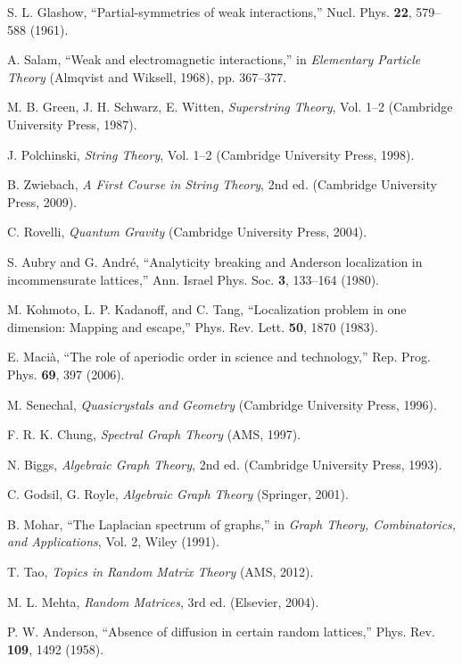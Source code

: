\documentclass[12pt,a4paper]{article}
\begin{document}
\begin{thebibliography}{99}
S. L. Glashow, ``Partial-symmetries of weak interactions,'' Nucl. Phys. \textbf{22}, 579–588 (1961).

A. Salam, ``Weak and electromagnetic interactions,'' in \emph{Elementary Particle Theory} (Almqvist and Wiksell, 1968), pp. 367–377.

M. B. Green, J. H. Schwarz, E. Witten, \emph{Superstring Theory}, Vol. 1–2 (Cambridge University Press, 1987).

J. Polchinski, \emph{String Theory}, Vol. 1–2 (Cambridge University Press, 1998).

B. Zwiebach, \emph{A First Course in String Theory}, 2nd ed. (Cambridge University Press, 2009).

C. Rovelli, \emph{Quantum Gravity} (Cambridge University Press, 2004).

S. Aubry and G. André, ``Analyticity breaking and Anderson localization in incommensurate lattices,'' Ann. Israel Phys. Soc. \textbf{3}, 133–164 (1980).

M. Kohmoto, L. P. Kadanoff, and C. Tang, ``Localization problem in one dimension: Mapping and escape,'' Phys. Rev. Lett. \textbf{50}, 1870 (1983).

E. Macià, ``The role of aperiodic order in science and technology,'' Rep. Prog. Phys. \textbf{69}, 397 (2006).

M. Senechal, \emph{Quasicrystals and Geometry} (Cambridge University Press, 1996).

F. R. K. Chung, \emph{Spectral Graph Theory} (AMS, 1997).

N. Biggs, \emph{Algebraic Graph Theory}, 2nd ed. (Cambridge University Press, 1993).

C. Godsil, G. Royle, \emph{Algebraic Graph Theory} (Springer, 2001).

B. Mohar, ``The Laplacian spectrum of graphs,'' in \emph{Graph Theory, Combinatorics, and Applications}, Vol. 2, Wiley (1991).

T. Tao, \emph{Topics in Random Matrix Theory} (AMS, 2012).

M. L. Mehta, \emph{Random Matrices}, 3rd ed. (Elsevier, 2004).

P. W. Anderson, ``Absence of diffusion in certain random lattices,'' Phys. Rev. \textbf{109}, 1492 (1958).

\end{thebibliography}
\end{document}
